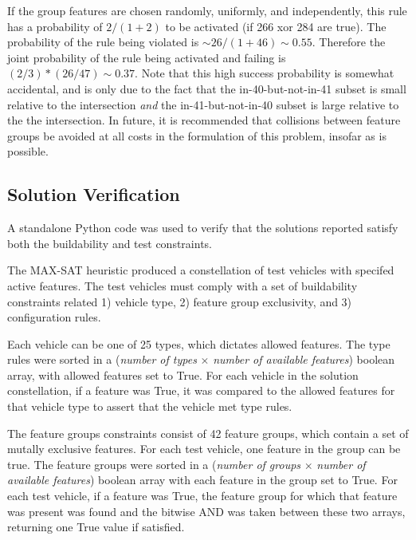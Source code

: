 \documentclass[aps,pra,twocolumn,superscriptaddress,groupedaddress]{revtex4}  %
\begin{document}
If the group features are chosen randomly, uniformly, and independently, this
rule has a probability of $2/(1+2)$ to be activated (if 266 xor 284 are true).
The probability of the rule being violated is $\sim 26/(1+46) \sim 0.55$.
Therefore the joint probability of the rule being activated and failing is
$(2/3) * (26/47) \sim 0.37$. Note that this high success probability is somewhat
accidental, and is only due to the fact that the in-40-but-not-in-41 subset is
small relative to the intersection \emph{and} the in-41-but-not-in-40 subset is
large relative to the the intersection. In future, it is recommended that
collisions between feature groups be avoided at all costs in the formulation of
this problem, insofar as is possible.

\subsection{Solution Verification}

A standalone Python code was used to verify that the solutions reported satisfy
both the buildability and test constraints.

The MAX-SAT heuristic produced a constellation of test vehicles with specifed
active features. The test vehicles must comply with a set of buildability
constraints related 1) vehicle type, 2) feature group exclusivity, and
3) configuration rules.

Each vehicle can be one of 25 types, which dictates allowed features. 
The type rules were sorted in a (\textit{number of types} $\times$
\textit{number of available features}) boolean array, with allowed features set
to True. For each vehicle in the solution constellation, if a feature was True,
it was compared to the allowed features for that vehicle type to assert that the
vehicle met type rules.

The feature groups constraints consist of 42 feature groups, which contain a set
of mutally exclusive features. For each test vehicle, one feature in the group can
be true. The feature groups were sorted in a (\textit{number of groups} $\times$
\textit{number of available features}) boolean array with each feature in the group
set to True. For each test vehicle, if a feature was True, the feature group for
which that feature was present was found and the bitwise AND was taken between
these two arrays, returning one True value if satisfied.
\end{document}

